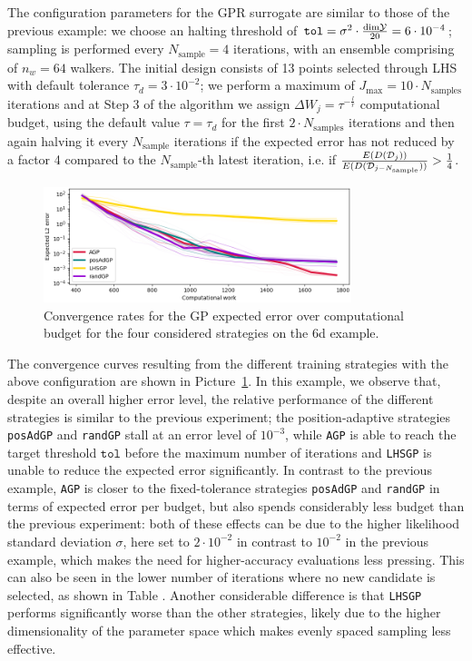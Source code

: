 The configuration parameters for the GPR surrogate are similar to those of the previous example: we choose an halting threshold of $\texttt{tol} = \sigma^2 \cdot \frac{\text{dim} \mathcal Y }{20} = 6\cdot 10^{-4}$; sampling is performed every $N_{\text{sample}} = 4$ iterations, with an ensemble comprising of $n_w = 64$ walkers.
The initial design consists of 13 points selected through LHS with default tolerance $\tau_d = 3 \cdot 10^{-2}$; we perform a maximum of $J_{\max} = 10 \cdot N_{\text{samples}}$ iterations and at Step 3 of the algorithm we assign $\Delta W_j = \tau ^{-\frac{l}{r}}$ computational budget, using the default value $\tau= \tau_d$ for the first $2\cdot N_{\text{samples}}$ iterations and then again halving it every $N_{\text{sample}}$ iterations if the expected error has not reduced by a factor 4 compared to the $N_{\text{sample}}$-th latest iteration, i.e. if $\frac{E(D(\mathcal D_j))}{E(D(\mathcal D_{j-N_{\text{sample}}}))} > \frac{1}{4}$.

\begin{figure}[H]
\begin{center}
    \includegraphics[width=0.8\textwidth]{results/pictures/d6/GP_res.png}
\end{center}
\caption{Convergence rates for the GP expected error over computational budget for the four considered strategies on the 6d example.}
    \label{fig:6dGPconv}
\end{figure}

The convergence curves resulting from the different training strategies with the above configuration are shown in Picture~\ref{fig:6dGPconv}.
In this example, we observe that, despite an overall higher error level, the relative performance of the different strategies is similar to the previous experiment; the position-adaptive strategies \texttt{posAdGP} and \texttt{randGP} stall at an error level of $10^{-3}$, while \texttt{AGP} is able to reach the target threshold $\texttt{tol}$ before the maximum number of iterations and \texttt{LHSGP} is unable to reduce the expected error significantly.
In contrast to the previous example, \texttt{AGP} is closer to the fixed-tolerance strategies \texttt{posAdGP} and \texttt{randGP} in terms of expected error per budget, but also spends considerably less budget than the previous experiment: both of these effects can be due to the higher likelihood standard deviation $\sigma$, here set to $2\cdot 10^{-2}$ in contrast to $10^{-2}$ in the previous example, which makes the need for higher-accuracy evaluations less pressing.
This can also be seen in the lower number of iterations where no new candidate is selected, as shown in Table .
Another considerable difference is that \texttt{LHSGP} performs significantly worse than the other strategies, likely due to the higher dimensionality of the parameter space which makes evenly spaced sampling less effective.

